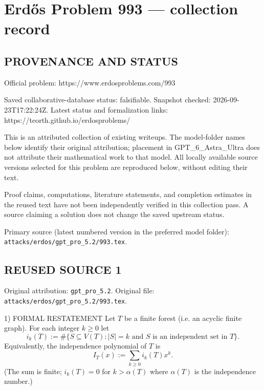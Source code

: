 \section*{Erd\H{o}s Problem 993 --- collection record}

\subsection*{PROVENANCE AND STATUS}
Official problem: https://www.erdosproblems.com/993

Saved collaborative-database status: falsifiable.
Snapshot checked: 2026-09-23T17:22:24Z.
Latest status and formalization links: https://teorth.github.io/erdosproblems/

This is an attributed collection of existing writeups. The model-folder names below identify their original attribution; placement in GPT\_6\_Astra\_Ultra does not attribute their mathematical work to that model. All locally available source versions selected for this problem are reproduced below, without editing their text.

Proof claims, computations, literature statements, and completion estimates in the reused text have not been independently verified in this collection pass. A source claiming a solution does not change the saved upstream status.

Primary source (latest numbered version in the preferred model folder): \texttt{attacks/erdos/gpt\_pro\_5.2/993.tex}.

\subsection*{REUSED SOURCE 1}
Original attribution: \texttt{gpt\_pro\_5.2}.
Original file: \texttt{attacks/erdos/gpt\_pro\_5.2/993.tex}.


1) FORMAL RESTATEMENT
Let $T$ be a finite forest (i.e. an acyclic finite graph).  For each integer $k\ge 0$ let
\[
 i_k(T) := \#\{S\subseteq V(T): |S|=k\text{ and $S$ is an independent set in }T\}.
\]
Equivalently, the independence polynomial of $T$ is
\[
 I_T(x) := \sum_{k\ge 0} i_k(T) x^k.
\]
(The sum is finite; $i_k(T)=0$ for $k>\alpha(T)$ where $\alpha(T)$ is the independence number.)

